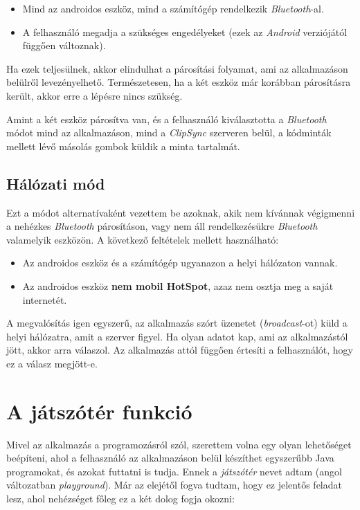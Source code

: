 \documentclass[12pt,a4paper]{article}
\begin{document}
	\begin{itemize}
		\item Mind az androidos eszköz, mind a számítógép rendelkezik \textit{Bluetooth}-al.
		\item A felhasználó megadja a szükséges engedélyeket (ezek az \textit{Android} verziójától függően változnak).
	\end{itemize}

	Ha ezek teljesülnek, akkor elindulhat a párosítási folyamat, ami az alkalmazáson belülről levezényelhető. Természetesen, ha a két eszköz már korábban párosításra 
	került, akkor erre a lépésre nincs szükség.
	
	Amint a két eszköz párosítva van, és a felhasználó kiválasztotta a \textit{Bluetooth} módot mind az alkalmazáson, mind a \textit{ClipSync} szerveren belül, a kódminták mellett lévő másolás gombok küldik a minta tartalmát.
	
	\subsection{Hálózati mód}
	
	Ezt a módot alternatívaként vezettem be azoknak, akik nem kívánnak végigmenni a nehézkes \textit{Bluetooth} párosításon, vagy nem áll rendelkezésükre \textit{Bluetooth} valamelyik eszközön. A következő feltételek mellett használható:
	
	\begin{itemize}
		\item Az androidos eszköz és a számítógép ugyanazon a helyi hálózaton vannak.
		\item Az androidos eszköz \textbf{nem mobil HotSpot}, azaz nem osztja meg a saját internetét.
	\end{itemize}

	A megvalósítás igen egyszerű, az alkalmazás szórt üzenetet (\textit{broadcast}-ot) küld a helyi hálózatra, amit a szerver figyel. Ha olyan adatot kap, ami az alkalmazástól jött, akkor arra válaszol. Az alkalmazás attól függően értesíti a felhasználót, hogy ez a válasz megjött-e.  
	
	\section{A játszótér funkció}

	Mivel az alkalmazás a programozásról szól, szerettem volna egy olyan lehetőséget beépíteni, ahol a felhasználó az alkalmazáson belül készíthet egyszerűbb Java programokat, és azokat futtatni is tudja. Ennek a \textit{játszótér} nevet adtam (angol változatban \textit{playground}). Már az elejétől fogva tudtam, hogy ez jelentős feladat lesz, ahol nehézséget főleg ez a két dolog fogja okozni:
	
\end{document}
